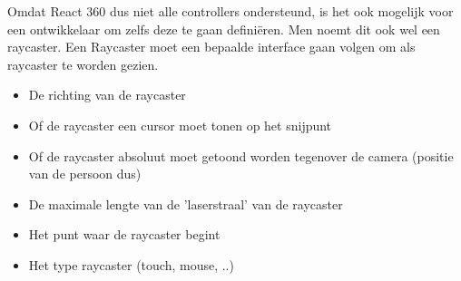 Omdat React 360 dus niet alle controllers ondersteund, is het ook mogelijk voor een ontwikkelaar om zelfs deze te gaan definiëren. Men noemt dit ook wel een raycaster. Een Raycaster moet een bepaalde interface gaan volgen om als raycaster te worden gezien.

\begin{itemize}
	\item De richting van de raycaster
	\item Of de raycaster een cursor moet tonen op het snijpunt
	\item Of de raycaster absoluut moet getoond worden tegenover de camera (positie van de persoon dus)
	\item De maximale lengte van de 'laserstraal' van de raycaster
	\item Het punt waar de raycaster begint
	\item Het type raycaster (touch, mouse, ..)
\end{itemize}